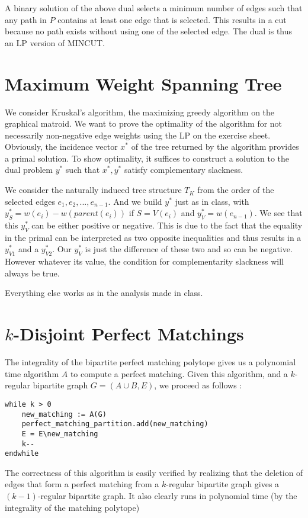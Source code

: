 \documentclass{scrartcl}
\newcommand\1{\mathbf{1}}
\begin{document}
A binary solution of the above dual selects a minimum number of edges such that any path in $P$ contains at least one edge that is selected. This results in a cut because no path exists without using one of the selected edge. The dual is thus an LP version of MINCUT.

\section{Maximum Weight Spanning Tree}
We consider Kruskal's algorithm, the maximizing greedy algorithm on the graphical matroid. We want to prove the optimality of the algorithm for not necessarily non-negative edge weights using the LP on the exercise sheet. Obviously, the incidence vector $x^*$ of the tree returned by the algorithm provides a primal solution. To show optimality, it suffices to construct a solution to the dual problem $y^*$ such that $x^*,y^*$ satisfy complementary slackness.

We consider the naturally induced tree structure $T_K$ from the order of the selected edges ${e_1,e_2,...,e_{n-1}}$. And we build $y^*$ just as in class, with $y^*_S = w(e_i) - w(parent(e_i))$ if $S=V(e_i)$ and $y^*_V = w(e_{n-1})$. We see that this $y^*_V$ can be either positive or negative. This is due to the fact that the equality in the primal can be interpreted as two opposite inequalities and thus results in a $y^*_{V1}$ and a $y^*_{V2}$. Our $y^*_V$ is just the difference of these two and so can be negative. However whatever its value, the condition for complementarity slackness will always be true.

Everything else works as in the analysis made in class.

\section{$k$-Disjoint Perfect Matchings}

The integrality of the bipartite perfect matching polytope gives us a polynomial time algorithm $A$ to compute a perfect matching. Given this algorithm, and a $k$-regular bipartite graph $G = (A \cup B,E)$, we proceed as follows :

\begin{verbatim}
while k > 0
    new_matching := A(G) 
    perfect_matching_partition.add(new_matching)
    E = E\new_matching
    k--
endwhile
\end{verbatim}

The correctness of this algorithm is easily verified by realizing that the deletion of edges that form a perfect matching from a $k$-regular bipartite graph gives a $(k-1)$-regular bipartite graph. It also clearly runs in polynomial time (by the integrality of the matching polytope)
\end{document}
